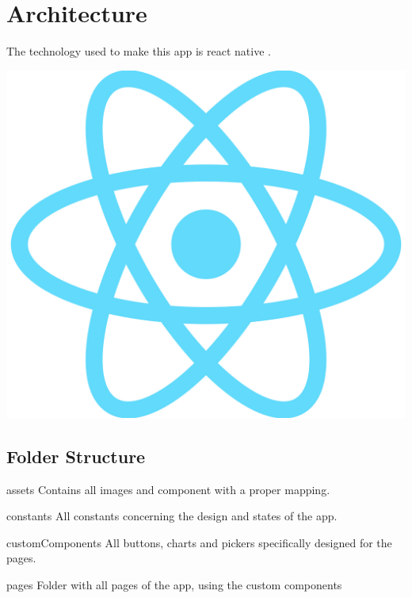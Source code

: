\documentclass[12pt,hidelinks]{article}
\begin{document}
\newpage
\section{Architecture}
\vspace{10.5cm}
	The technology used to make this app is react native \cite{React Native}.
	\begin{center}

	\includegraphics[scale=0.1]{RN}
\end{center}

	\subsection{Folder Structure}
	\begin{docCommand}{assets}{}
		Contains all images and component with a proper mapping.
	\end{docCommand}

	\begin{docCommand}{constants}{}
		All constants concerning the design and states of the app.
	\end{docCommand}

	\begin{docCommand}{customComponents}{}
		All buttons, charts and pickers specifically designed for the pages.
	\end{docCommand}

	\begin{docCommand}{pages}{}
		Folder with all pages of the app, using the custom components
	\end{docCommand}
\end{document}
